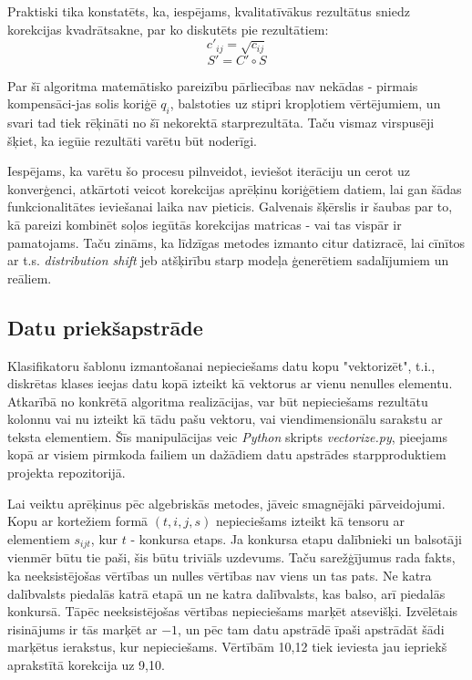 \documentclass[12pt, a4paper]{article}
\begin{document}
Praktiski tika konstatēts, ka, iespējams, kvalitatīvākus rezultātus sniedz korekcijas kvadrātsakne, par ko diskutēts pie rezultātiem:
\begin{equation}
    c'_{ij} = \sqrt{c_{ij}}
\end{equation}
\begin{equation}
    S' = C' \circ S
\end{equation}


Par šī algoritma matemātisko pareizību pārliecības nav nekādas - pirmais kompensāci-jas solis koriģē $q_i$, balstoties uz stipri kropļotiem vērtējumiem, un svari tad tiek rēķināti no šī nekorektā starprezultāta. Taču vismaz virspusēji šķiet, ka iegūie rezultāti varētu būt noderīgi. 

Iespējams, ka varētu šo procesu pilnveidot, ieviešot iterāciju un cerot uz konverģenci, atkārtoti veicot korekcijas aprēķinu koriģētiem datiem, lai gan šādas funkcionalitātes ieviešanai laika nav pieticis. Galvenais šķērslis ir šaubas par to, kā pareizi kombinēt soļos iegūtās korekcijas matricas - vai tas vispār ir pamatojams. Taču zināms, ka līdzīgas metodes izmanto citur datizracē, lai cīnītos ar t.s. \textit{distribution shift} jeb atšķirību starp modeļa ģenerētiem sadalījumiem un reāliem.

\subsection{Datu priekšapstrāde}

Klasifikatoru šablonu izmantošanai nepieciešams datu kopu "vektorizēt", t.i., diskrētas klases ieejas datu kopā izteikt kā vektorus ar vienu nenulles elementu. Atkarībā no konkrētā algoritma realizācijas, var būt nepieciešams rezultātu kolonnu vai nu izteikt kā tādu pašu vektoru, vai viendimensionālu sarakstu ar teksta elementiem. Šīs manipulācijas veic \textit{Python} skripts \textit{vectorize.py}, pieejams kopā ar visiem pirmkoda failiem un dažādiem datu apstrādes starpproduktiem projekta repozitorijā.

Lai veiktu aprēķinus pēc algebriskās metodes, jāveic smagnējāki pārveidojumi. Kopu ar kortežiem formā $(t,i,j,s)$ nepieciešams izteikt kā tensoru ar elementiem $s_{ijt}$, kur $t$ - konkursa etaps. Ja konkursa etapu dalībnieki un balsotāji vienmēr būtu tie paši, šis būtu triviāls uzdevums. Taču sarežģījumus rada fakts, ka neeksistējošas vērtības un nulles vērtības nav viens un tas pats. Ne katra dalībvalsts piedalās katrā etapā un ne katra dalībvalsts, kas balso, arī piedalās konkursā. Tāpēc neeksistējošas vērtības nepieciešams marķēt atsevišķi. Izvēlētais risinājums ir tās marķēt ar $-1$, un pēc tam datu apstrādē īpaši apstrādāt šādi marķētus ierakstus, kur nepieciešams. Vērtībām 10,12 tiek ieviesta jau iepriekš aprakstītā korekcija uz 9,10.
\end{document}
